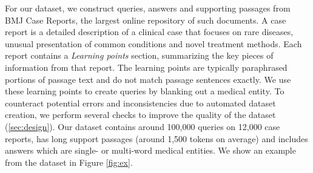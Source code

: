\documentclass[11pt,a4paper]{article}
\begin{document}
For our dataset, we construct queries, answers and supporting passages from BMJ Case Reports, the largest online repository of such documents. A case report is a detailed description of a clinical case that focuses on rare diseases, unusual presentation of common conditions and novel treatment methods. Each report contains a \textit{Learning points} section, summarizing the key pieces of information from that report. The learning points are typically paraphrased portions of passage text and do not match passage sentences exactly. We use these learning points to create queries by blanking out a medical entity. To counteract potential errors and inconsistencies due to automated dataset creation, we perform several checks to improve the quality of the dataset (\autoref{sec:design}). Our dataset contains around 100,000 queries on 12,000 case reports, has long support passages (around 1,500 tokens on average) and includes answers which are single- or multi-word medical entities. We show an example from the dataset in Figure \ref{fig:ex}. 
\end{document}

